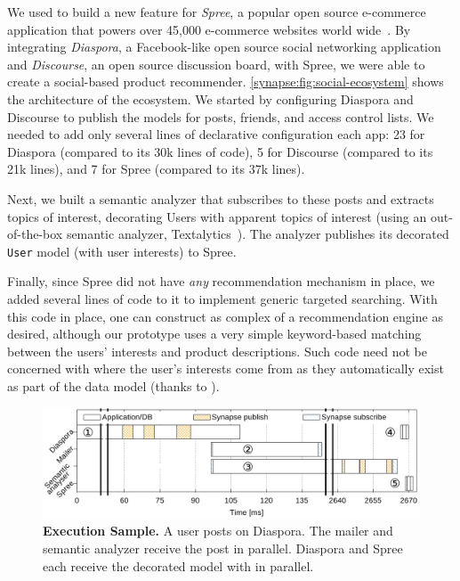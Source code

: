 We used \synapse to build a new feature for \emph{Spree}, a popular open source
e-commerce application that powers over 45,000 e-commerce websites world wide~\cite{spree-site}.
By integrating \emph{Diaspora}, a Facebook-like open source social networking
application and \emph{Discourse}, an open source discussion board, with Spree, we
were able to create a social-based product recommender.
\F\ref{synapse:fig:social-ecosystem} shows the architecture of the ecosystem.
We started by configuring Diaspora and Discourse to publish the models
for posts, friends, and access control lists.
We needed to add only several lines of declarative configuration each app: 23
for Diaspora (compared to its 30k lines of code), 5 for Discourse (compared to
its 21k lines), and 7 for Spree (compared to its 37k lines).

Next, we built a semantic analyzer that subscribes to these posts and extracts topics of interest, decorating Users with apparent topics of interest (using an out-of-the-box semantic analyzer, Textalytics~\cite{textalytics}).
The analyzer publishes its decorated {\tt User} model (with user interests) to Spree.

Finally, since Spree did not have \emph{any} recommendation mechanism in place, we added several lines of code to it to implement generic targeted searching.
With this code in place, one can construct as complex of a recommendation engine as
desired, although our prototype uses a very simple keyword-based matching
between the users' interests and product descriptions. Such code need not be
concerned with where the user's interests come from as they
automatically exist as part of the data model (thanks to \synapse).




\begin{figure}
  \centering
  \includegraphics[width=\linewidth]{figures/synapse/diaspora1.pdf}
  \caption{{\bf Execution Sample.}
      A user posts on Diaspora. The mailer  and semantic
     analyzer  receive the post in parallel. Diaspora  and Spree
      each receive the decorated model with in parallel.}
  \label{synapse:fig:diaspora1}
\end{figure}


